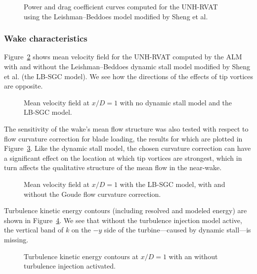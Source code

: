 \begin{figure}
    \caption{Power and drag coefficient curves computed for the UNH-RVAT using
        the Leishman--Beddoes model modified by Sheng et al.}
    
    \label{fig:RVAT-ALM-perf-curves}
\end{figure}


\subsubsection{Wake characteristics}

Figure~\ref{fig:RVAT-ALM-meancontquiv-DS} shows mean velocity field for the
UNH-RVAT computed by the ALM with and without the Leishman--Beddoes dynamic
stall model modified by Sheng et al. (the LB-SGC model). We see how the
directions of the effects of tip vortices are opposite.

\begin{figure}
    \caption{Mean velocity field at $x/D=1$ with no dynamic stall model and the
        LB-SGC model.}
    
    \label{fig:RVAT-ALM-meancontquiv-DS}
\end{figure}

The sensitivity of the wake's mean flow structure was also tested with respect
to flow curvature correction for blade loading, the results for which are
plotted in Figure~\ref{fig:RVAT-ALM-flow-curvature}. Like the dynamic stall
model, the chosen curvature correction can have a significant effect on the
location at which tip vortices are strongest, which in turn affects the
qualitative structure of the mean flow in the near-wake.

\begin{figure}
    \caption{Mean velocity field at $x/D=1$ with the LB-SGC model, with and
        without the Goude flow curvature correction.}
    
    \label{fig:RVAT-ALM-flow-curvature}
\end{figure}

Turbulence kinetic energy contours (including resolved and modeled energy) are
shown in Figure~\ref{fig:RVAT-ALM-kcont}. We see that without the turbulence
injection model active, the vertical band of $k$ on the $-y$ side of the
turbine---caused by dynamic stall---is missing.

\begin{figure}
    \caption{Turbulence kinetic energy contours at $x/D=1$ with an without
        turbulence injection activated.}
    
    \label{fig:RVAT-ALM-kcont}
\end{figure}

